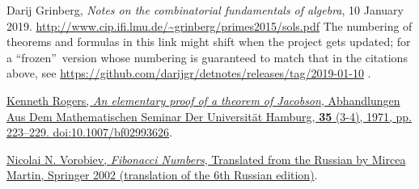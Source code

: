 \documentclass[paper=a4, fontsize=12pt]{scrartcl}%
\theoremstyle{plainsl}
\theoremstyle{definition}
\theoremstyle{remark}
\begin{document}
\begin{thebibliography}{99999999}                                                                                         %


Darij Grinberg, \textit{Notes on the combinatorial
fundamentals of algebra}, 10 January 2019. \newline%
\url{http://www.cip.ifi.lmu.de/~grinberg/primes2015/sols.pdf} \newline The
numbering of theorems and formulas in this link might shift when the project
gets updated; for a \textquotedblleft frozen\textquotedblright\ version whose
numbering is guaranteed to match that in the citations above, see
\url{https://github.com/darijgr/detnotes/releases/tag/2019-01-10} .

\href{https://doi.org/10.1007/BF02993626}{Kenneth
Rogers, \textit{An elementary proof of a theorem of Jacobson}, Abhandlungen
Aus Dem Mathematischen Seminar Der Universit\"{a}t Hamburg, \textbf{35} (3-4),
1971, pp. 223--229. doi:10.1007/bf02993626}.

%
\href{https://doi.org/10.1007/978-3-0348-8107-4}{Nicolai N. Vorobiev,
\textit{Fibonacci Numbers}, Translated from the Russian by Mircea Martin,
Springer 2002 (translation of the 6th Russian edition)}.
\end{thebibliography}
\end{document}

